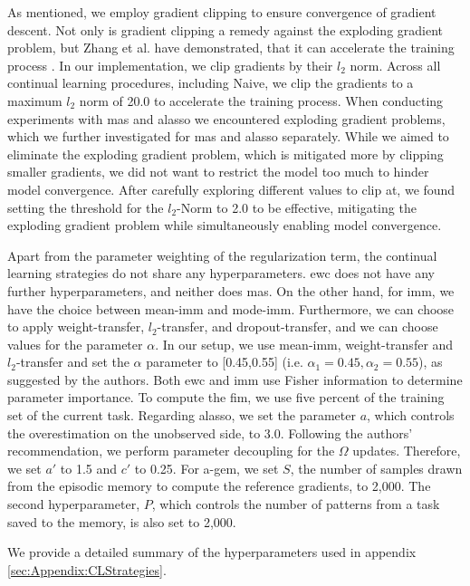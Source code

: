 As mentioned, we employ gradient clipping to ensure convergence of gradient descent. Not only is gradient clipping a remedy against the exploding
gradient problem, but Zhang et al. have demonstrated, that it can accelerate the training process \cite{zhang2019gradient}. In our implementation, we clip gradients by their
$l_2$ norm. Across all continual learning procedures, including Naive, we clip the gradients to a maximum $l_2$ norm of 20.0 to accelerate the training process.
When conducting experiments with \gls{mas} and \gls{alasso} we encountered exploding gradient problems, which we further investigated for \gls{mas} and \gls{alasso}
separately. While we aimed to eliminate the exploding gradient problem, which is mitigated more by clipping smaller gradients, we did not want to restrict the
model too much to hinder model convergence. After carefully exploring different values to clip at, we found setting the threshold for the $l_2$-Norm to 2.0
to be effective, mitigating the exploding gradient problem while simultaneously enabling model convergence. \par
Apart from the parameter weighting of the regularization term, the continual learning strategies do not share any hyperparameters. \gls{ewc} does not have
any further hyperparameters, and neither does \gls{mas}. On the other hand, for \gls{imm}, we have the choice between mean-\gls{imm} and mode-\gls{imm}. Furthermore,
we can choose to apply weight-transfer, $l_2$-transfer, and dropout-transfer, and we can choose values for the parameter $\alpha$. In our setup, we use mean-\gls{imm},
weight-transfer and $l_2$-transfer and set the $\alpha$ parameter to [0.45,0.55] (i.e. $\alpha_1 = 0.45, \alpha_2 = 0.55$), as suggested by the authors. Both \gls{ewc} and
\gls{imm} use Fisher information to determine parameter importance. To compute the \gls{fim}, we use five percent of the training set of the current task.
Regarding \gls{alasso}, we set the parameter $a$, which controls the overestimation on the unobserved side, to 3.0. Following the authors' recommendation,
we perform parameter decoupling for the $\Omega$ updates. Therefore, we set $a'$ to 1.5 and $c'$ to 0.25. For \gls{a-gem}, we set $S$, the number of samples
drawn from the episodic memory to compute the reference gradients, to 2,000. The second hyperparameter, $P$, which controls the number of patterns from a task
saved to the memory, is also set to 2,000. \par
We provide a detailed summary of the hyperparameters used in appendix \ref{sec:Appendix:CLStrategies}.


